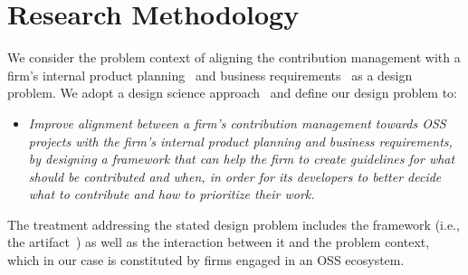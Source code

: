 \documentclass[a4paper]{llncs}
\begin{document}
\vspace{-0.3cm}
\section{Research Methodology}
\vspace{-0.3cm}

We consider the problem context of aligning the contribution management with a firm's internal product planning~\cite{fricker2012software} and business requirements~\cite{wiegers2013software} as a design problem. We adopt a design science approach~\cite{wieringa2014design} and define our design problem to:

\begin{itemize}[nosep]\footnotesize
    \item \textit{Improve alignment between a firm’s contribution management towards OSS projects with the firm’s internal product planning and business requirements,
    by designing a framework
    that can help the firm to create guidelines for what should be contributed and when,
    in order for its developers to better decide what to contribute and how to prioritize their work. }
\end{itemize}

The treatment addressing the stated design problem includes the framework (i.e., the artifact~\cite{wieringa2014design}) as well as the interaction between it and the problem context, which in our case is constituted by firms engaged in an OSS ecosystem.

\end{document}
